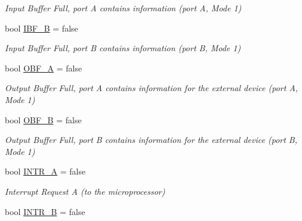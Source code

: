 \begin{DoxyCompactItemize}
\begin{DoxyCompactList}\small\item\em Input Buffer Full, port A contains information (port A, Mode 1) \end{DoxyCompactList}\item 
\hypertarget{classIntel8255_a5576bb32d1d14c809954c95b1e140b00}{bool \hyperlink{classIntel8255_a5576bb32d1d14c809954c95b1e140b00}{I\-B\-F\-\_\-\-B} = false}\label{classIntel8255_a5576bb32d1d14c809954c95b1e140b00}

\begin{DoxyCompactList}\small\item\em Input Buffer Full, port B contains information (port B, Mode 1) \end{DoxyCompactList}\item 
\hypertarget{classIntel8255_ad6207273407dcfb3ed9785613838baf7}{bool \hyperlink{classIntel8255_ad6207273407dcfb3ed9785613838baf7}{O\-B\-F\-\_\-\-A} = false}\label{classIntel8255_ad6207273407dcfb3ed9785613838baf7}

\begin{DoxyCompactList}\small\item\em Output Buffer Full, port A contains information for the external device (port A, Mode 1) \end{DoxyCompactList}\item 
\hypertarget{classIntel8255_a5d84e8f433d4aeaf15d5f79cbadd878e}{bool \hyperlink{classIntel8255_a5d84e8f433d4aeaf15d5f79cbadd878e}{O\-B\-F\-\_\-\-B} = false}\label{classIntel8255_a5d84e8f433d4aeaf15d5f79cbadd878e}

\begin{DoxyCompactList}\small\item\em Output Buffer Full, port B contains information for the external device (port B, Mode 1) \end{DoxyCompactList}\item 
\hypertarget{classIntel8255_a1b037b991428a40a2c4437723fc26b63}{bool \hyperlink{classIntel8255_a1b037b991428a40a2c4437723fc26b63}{I\-N\-T\-R\-\_\-\-A} = false}\label{classIntel8255_a1b037b991428a40a2c4437723fc26b63}

\begin{DoxyCompactList}\small\item\em Interrupt Request A (to the microprocessor) \end{DoxyCompactList}\item 
\hypertarget{classIntel8255_af60b776612a4b393fb3ceb0fcb273750}{bool \hyperlink{classIntel8255_af60b776612a4b393fb3ceb0fcb273750}{I\-N\-T\-R\-\_\-\-B} = false}\label{classIntel8255_af60b776612a4b393fb3ceb0fcb273750}


\end{DoxyCompactItemize}
